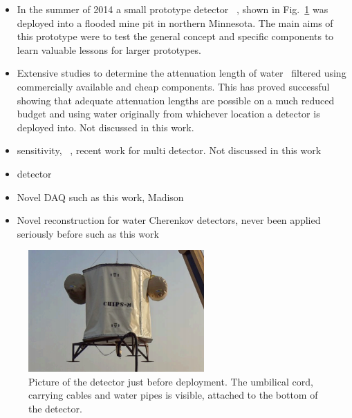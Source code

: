 \begin{itemize}
    \item In the summer of 2014 a small prototype detector \chipsm~\cite{perch2015,
              pfutznerProto2017, pfutzner2017}, shown in Fig.~\ref{fig:chips_m} was deployed into
          a flooded mine pit in northern Minnesota. The main aims of this prototype were to
          test the general concept and specific components to learn valuable lessons for
          larger \chips prototypes.

    \item Extensive studies to determine the attenuation length of water~\cite{amat2017,
              campbell2020} filtered using commercially available and cheap components. This has
          proved successful showing that adequate attenuation lengths are possible on a much
          reduced budget and using water originally from whichever location a \chips detector is
          deployed into. Not discussed in this work.

    \item \chips sensitivity, ~\cite{pfutzner2017, adde2016, lang2015}, recent work for multi
          detector. Not discussed in this work

    \item \chipsfive detector

    \item Novel DAQ such as this work, Madison~\cite{eijk2018}

    \item Novel reconstruction for water Cherenkov detectors, never been applied seriously before
          such as this work
\end{itemize}

\begin{figure} %
    \includegraphics[width=0.6\textwidth]{diagrams/4-chips/chips_m.png}
    \caption[Picture of the \chipsm detector.]
    {Picture of the \chipsm detector just before deployment. The umbilical cord, carrying cables
        and water pipes is visible, attached to the bottom of the detector.}
    \label{fig:chips_m}
\end{figure}

